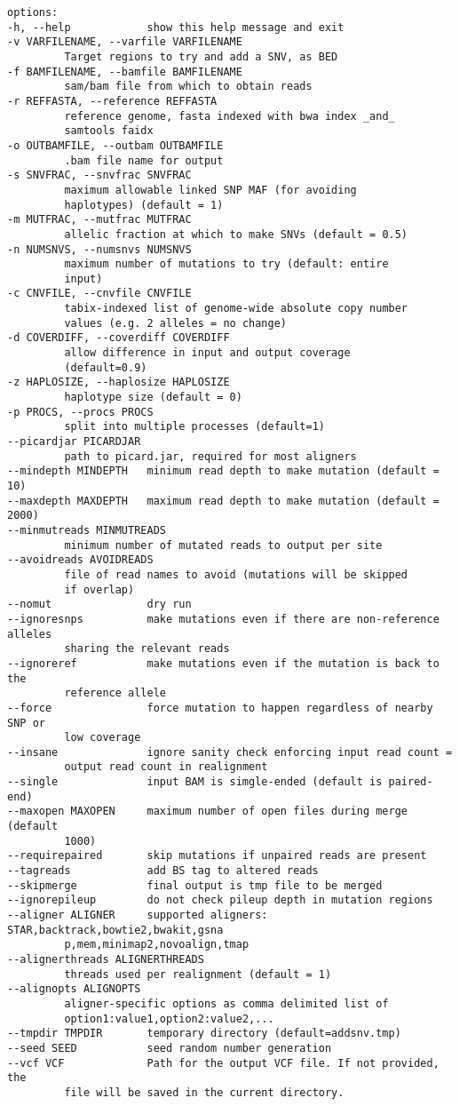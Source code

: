 \documentclass[letterpaper,11pt]{article}
\begin{document}
\begin{verbatim}
options:
-h, --help            show this help message and exit
-v VARFILENAME, --varfile VARFILENAME
         Target regions to try and add a SNV, as BED
-f BAMFILENAME, --bamfile BAMFILENAME
         sam/bam file from which to obtain reads
-r REFFASTA, --reference REFFASTA
         reference genome, fasta indexed with bwa index _and_
         samtools faidx
-o OUTBAMFILE, --outbam OUTBAMFILE
         .bam file name for output
-s SNVFRAC, --snvfrac SNVFRAC
         maximum allowable linked SNP MAF (for avoiding
         haplotypes) (default = 1)
-m MUTFRAC, --mutfrac MUTFRAC
         allelic fraction at which to make SNVs (default = 0.5)
-n NUMSNVS, --numsnvs NUMSNVS
         maximum number of mutations to try (default: entire
         input)
-c CNVFILE, --cnvfile CNVFILE
         tabix-indexed list of genome-wide absolute copy number
         values (e.g. 2 alleles = no change)
-d COVERDIFF, --coverdiff COVERDIFF
         allow difference in input and output coverage
         (default=0.9)
-z HAPLOSIZE, --haplosize HAPLOSIZE
         haplotype size (default = 0)
-p PROCS, --procs PROCS
         split into multiple processes (default=1)
--picardjar PICARDJAR
         path to picard.jar, required for most aligners
--mindepth MINDEPTH   minimum read depth to make mutation (default = 10)
--maxdepth MAXDEPTH   maximum read depth to make mutation (default = 2000)
--minmutreads MINMUTREADS
         minimum number of mutated reads to output per site
--avoidreads AVOIDREADS
         file of read names to avoid (mutations will be skipped
         if overlap)
--nomut               dry run
--ignoresnps          make mutations even if there are non-reference alleles
         sharing the relevant reads
--ignoreref           make mutations even if the mutation is back to the
         reference allele
--force               force mutation to happen regardless of nearby SNP or
         low coverage
--insane              ignore sanity check enforcing input read count =
         output read count in realignment
--single              input BAM is simgle-ended (default is paired-end)
--maxopen MAXOPEN     maximum number of open files during merge (default
         1000)
--requirepaired       skip mutations if unpaired reads are present
--tagreads            add BS tag to altered reads
--skipmerge           final output is tmp file to be merged
--ignorepileup        do not check pileup depth in mutation regions
--aligner ALIGNER     supported aligners: STAR,backtrack,bowtie2,bwakit,gsna
         p,mem,minimap2,novoalign,tmap
--alignerthreads ALIGNERTHREADS
         threads used per realignment (default = 1)
--alignopts ALIGNOPTS
         aligner-specific options as comma delimited list of
         option1:value1,option2:value2,...
--tmpdir TMPDIR       temporary directory (default=addsnv.tmp)
--seed SEED           seed random number generation
--vcf VCF             Path for the output VCF file. If not provided, the
         file will be saved in the current directory.


\end{verbatim}
\end{document}
